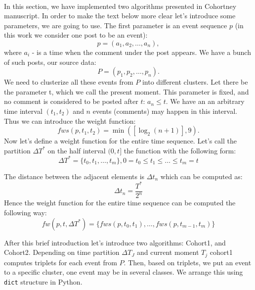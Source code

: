 \documentclass[10pt]{article}
\begin{document}
\paragraph{}
In this section, we have implemented two algorithms presented in Cohortney manuscript. In order to make the text below more clear let's introduce some parameters, we are going to use. The first parameter is an event sequence $p$ (in this work we consider one post to be an event):
\begin{equation}
    p = (a_1, a_2, \dots, a_n),
\end{equation}
where $a_i$ - is a time when the comment under the post appears. We have a bunch of such posts, our source data:
\begin{equation}
    P = (p_1, p_2, \dots, p_n).
\end{equation}
We need to clusterize all these events from $P$ into different clusters. Let there be the parameter t, which we call the present moment. This parameter is fixed, and no comment is considered to be posted after $t$: $a_n \leq t$.  We have an an arbitrary time interval $(t_1 , t_2)$ and $n$ events (comments) may happen in this interval. Thus we can introduce the weight function:
\begin{equation}
\label{eqn:fws}
    fws(p, t_1, t_2) =  \min ([\log_2 (n+1)], 9).
\end{equation}
Now let's define a weight function for the entire time sequence. Let's call the partition $\Delta T^*$ on the half interval $(0, t]$ the function with the following form:
\begin{equation}
    \Delta T^* = \{t_0, t_1, \dots, t_m\}, 0=t_0 \leq t_1 \leq \dots \leq t_m =t
\end{equation}

The distance between the adjacent elements is $\Delta t_n$ which can be computed as:
\begin{equation}
    \Delta t_n = \frac{T^*}{2^n}
\end{equation}
Hence the weight function for the entire time sequence can be computed the following way:
\begin{equation}
\label{eqn:fws_interval}
    fw(p, t, \Delta T^*) = \{fws(p, t_0, t_1), \dots, fws(p, t_{m-1}, t_m)\}
\end{equation}


After this brief introduction let's introduce two algorithms: Cohort1, and Cohort2. Depending on time partition $\Delta T_J$ and current moment $T_j$ cohort1 computes triplets for each event from $P$. Then, based on triplets, we put an event to a specific cluster, one event may be in several classes. We arrange this using \texttt{dict} structure in Python.
\end{document}
